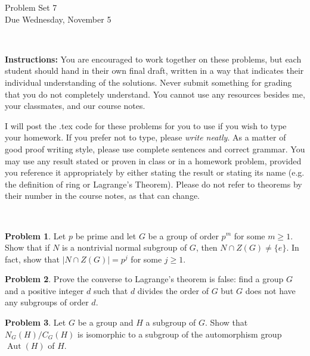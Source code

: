 \documentclass[11pt]{article}
\title{}
\date{\vspace{-0.5in}}
\DeclareMathOperator{\Aut}{Aut}
\theoremstyle{definition}
\newtheorem{problem}{Problem}
\begin{document}
\thispagestyle{fancy}
\pagestyle{fancy}

\vspace{3em}

\begin{center}
	{\LARGE Problem Set 7 \\}
	Due Wednesday, November 5
\end{center}

\

\noindent
{\bf Instructions:}
You are encouraged to work together on these problems, but each student should hand in their own final draft, written in a way that indicates their individual understanding of the solutions. Never submit something for grading that you do not completely understand. You cannot use any resources besides me, your classmates, and our course notes.


I will post the .tex code for these problems for you to use if you wish to type your homework. If you prefer not to type, please  {\em write neatly}. As a matter of good proof writing style, please use complete sentences and correct grammar. You may use any result  stated or proven in class or in a homework problem, provided you reference it appropriately by either stating the result or stating its name (e.g. the definition of ring or Lagrange's Theorem). Please do not refer to theorems by their number in the course notes, as that can change.


\



\begin{problem}
	Let $p$ be prime and let $G$ be a group of order $p^m$ for some $m \geqslant 1$. Show that if $N$ is a nontrivial normal subgroup of $G$, then $N \cap Z(G) \ne \{e\}$. In fact, show that $|N \cap Z(G)| = p^j$ for some $j \geqslant 1$. 
\end{problem}



\begin{problem}
Prove the converse to Lagrange's theorem is false: find a group $G$ and a positive integer $d$ such that $d$ divides the order of $G$ but $G$ does not have any subgroups of order $d$.		
\end{problem}



\begin{problem}
Let $G$ be a group and $H$ a subgroup of $G$. Show that $N_G(H)/C_G(H)$ is isomorphic to a subgroup of the automorphism group $\Aut(H)$ of $H$.
\end{problem}
\end{document}
